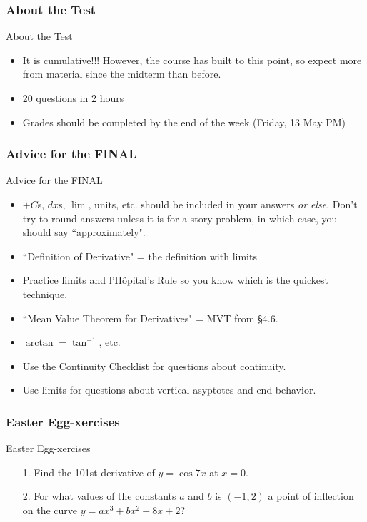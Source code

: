 \documentclass[cal1spr16Lectures.tex]{subfiles}
\begin{document}
\subsubsection[About the Test]{About the Test}

\begin{frame}{\small About the Test}
\begin{itemize}
\item It is cumulative!!! However, the course has built to this point, so expect more from material since the midterm than before.
\item 20 questions in 2 hours
\item Grades should be completed by the end of the week (Friday, 13 May PM)
\end{itemize}
\end{frame}

\subsubsection[Advice for the FINAL]{Advice for the FINAL}

\begin{frame}{\small Advice for the FINAL}
\begin{itemize}\footnotesize
\item $+C$s, $dx$s, $\lim$, units, etc. should be included in your answers {\it or else}.  Don't try to round answers unless it is for a story problem, in which case, you should say ``approximately".
\item ``Definition of Derivative" = the definition with limits
\item Practice limits and l'H\^{o}pital's Rule so you know which is the quickest technique.
\item ``Mean Value Theorem for Derivatives" = MVT from \S 4.6.
\item $\arctan=\tan^{-1}$, etc.
\item Use the Continuity Checklist for questions about continuity.
\item Use limits for questions about vertical asyptotes and end behavior.
\end{itemize}
\end{frame}

\subsubsection{Easter Egg-xercises}

\begin{frame}{\small Easter Egg-xercises}
\begin{exe}[s] \begin{itemize}
\item[1.] Find the 101st derivative of $y=\cos{7x}$ at $x=0$.
\item[2.] For what values of the constants $a$ and $b$ is $(-1,2)$ a point of inflection on the curve $y=ax^3+bx^2-8x+2$?
\end{itemize}\end{exe}
\end{frame}

\begin{comment}
\end{comment}
\end{document}
